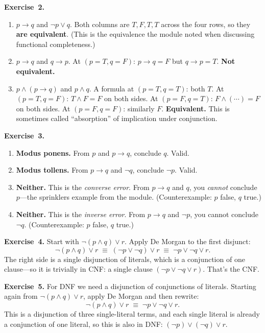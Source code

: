 \documentclass[11pt]{article}
\begin{document}
\medskip
\textbf{Exercise~2.}
\begin{enumerate}[label=(\alph*)]
  \item $p \to q$ and $\lnot p \vee q$. Both columns are $T, F, T, T$ across the four rows, so they \textbf{are equivalent}. (This is the equivalence the module noted when discussing functional completeness.)
  \item $p \to q$ and $q \to p$. At $(p=T, q=F)$: $p \to q = F$ but $q \to p = T$. \textbf{Not equivalent.}
  \item $p \wedge (p \to q)$ and $p \wedge q$. A formula at $(p=T, q=T)$: both $T$. At $(p=T, q=F)$: $T \wedge F = F$ on both sides. At $(p=F, q=T)$: $F \wedge (\cdots) = F$ on both sides. At $(p=F, q=F)$: similarly $F$. \textbf{Equivalent.} This is sometimes called ``absorption'' of implication under conjunction.
\end{enumerate}

\medskip
\textbf{Exercise~3.}
\begin{enumerate}[label=(\alph*)]
  \item \textbf{Modus ponens.} From $p$ and $p \to q$, conclude $q$. Valid.
  \item \textbf{Modus tollens.} From $p \to q$ and $\lnot q$, conclude $\lnot p$. Valid.
  \item \textbf{Neither.} This is the \emph{converse error}. From $p \to q$ and $q$, you \emph{cannot} conclude $p$---the sprinklers example from the module. (Counterexample: $p$ false, $q$ true.)
  \item \textbf{Neither.} This is the \emph{inverse error}. From $p \to q$ and $\lnot p$, you cannot conclude $\lnot q$. (Counterexample: $p$ false, $q$ true.)
\end{enumerate}

\medskip
\textbf{Exercise~4.}
Start with $\lnot(p \wedge q) \vee r$. Apply De Morgan to the first disjunct:
\[
  \lnot(p \wedge q) \vee r \;\equiv\; (\lnot p \vee \lnot q) \vee r \;\equiv\; \lnot p \vee \lnot q \vee r.
\]
The right side is a single disjunction of literals, which is a conjunction of one clause---so it is trivially in CNF: a single clause $(\lnot p \vee \lnot q \vee r)$. That's the CNF.

\medskip
\textbf{Exercise~5.}
For DNF we need a disjunction of conjunctions of literals. Starting again from $\lnot(p \wedge q) \vee r$, apply De Morgan and then rewrite:
\[
  \lnot(p \wedge q) \vee r \;\equiv\; \lnot p \vee \lnot q \vee r.
\]
This is a disjunction of three single-literal terms, and each single literal is already a conjunction of one literal, so this is also in DNF: $(\lnot p) \vee (\lnot q) \vee r$.
\end{document}
